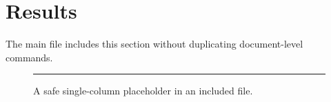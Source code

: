 \section{Results}

The main file includes this section without duplicating document-level commands.

\begin{figure}[t]
\centering
\rule{0.95\columnwidth}{20mm}
\caption{A safe single-column placeholder in an included file.}
\label{fig:project-result}
\end{figure}
